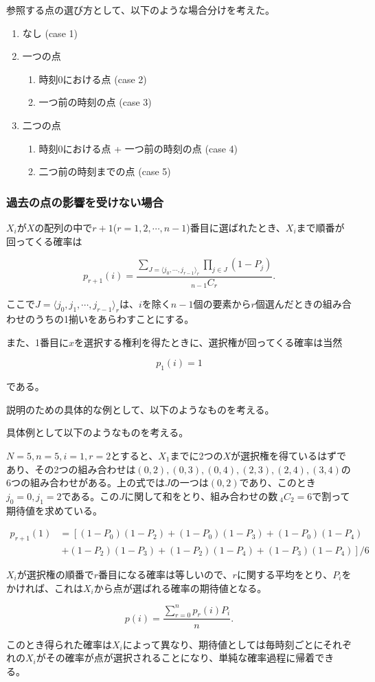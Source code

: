 参照する点の選び方として、以下のような場合分けを考えた。

\begin{enumerate}
    \item なし (case 1)
    \item 一つの点
    \begin{enumerate}
        \item 時刻0における点 (case 2)
        \item 一つ前の時刻の点 (case 3)
        \end{enumerate}
    \item 二つの点
    \begin{enumerate}
        \item 時刻0における点 + 一つ前の時刻の点 (case 4)
        \item 二つ前の時刻までの点 (case 5)
        \end{enumerate}
\end{enumerate}

\subsubsection{過去の点の影響を受けない場合}

$X_{i}$が$X$の配列の中で$r+1$($r = 1, 2, \cdots , n-1$)番目に選ばれたとき、$X_{i}$まで順番が回ってくる確率は

$$p_{r+1}(i) = \frac{\sum_{J = \langle j_{0}, \cdots ,j_{r-1} \rangle _{r}}\prod_{j\in J}(1-P_{j})}{_{n-1}C_{r}}.$$

ここで$J = \langle j_{0}, j_{1}, \cdots ,j_{r-1} \rangle_{r}$は、$i$を除く$n-1$個の要素から$r$個選んだときの組み合わせのうちの1揃いをあらわすことにする。

また、1番目に$x$を選択する権利を得たときに、選択権が回ってくる確率は当然

$$p_{1}(i) = 1$$

である。

説明のための具体的な例として、以下のようなものを考える。

具体例として以下のようなものを考える。

$N = 5, n = 5, i = 1, r = 2$とすると、$X_{1}$までに2つの$X$が選択権を得ているはずであり、その2つの組み合わせは$(0,2), (0,3), (0,4), (2,3), (2,4), (3,4)$の6つの組み合わせがある。上の式では$J$の一つは$(0, 2)$であり、このとき$j_{0} = 0, j_{1} = 2$である。この$J$に関して和をとり、組み合わせの数$\ _{4}C_{2} = 6$で割って期待値を求めている。

\begin{align}
p_{r+1}(1) &= \left[(1-P_{0})(1-P_{2}) + (1-P_{0})(1-P_{3}) + (1-P_{0})(1-P_{4}) \right.\\
&\ \left. + (1-P_{2})(1-P_{3}) + (1-P_{2})(1-P_{4}) + (1-P_{3})(1-P_{4}) \right]/6
\end{align}

$X_{i}$が選択権の順番で$r$番目になる確率は等しいので、$r$に関する平均をとり、$P_{i}$をかければ、これは$X_{i}$から点が選ばれる確率の期待値となる。

$$p(i) = \frac{\sum_{r=0}^{n}p_{r}(i)P_{i}}{n}.$$

このとき得られた確率は$X_{i}$によって異なり、期待値としては毎時刻ごとにそれぞれの$X_{i}$がその確率が点が選択されることになり、単純な確率過程に帰着できる。

